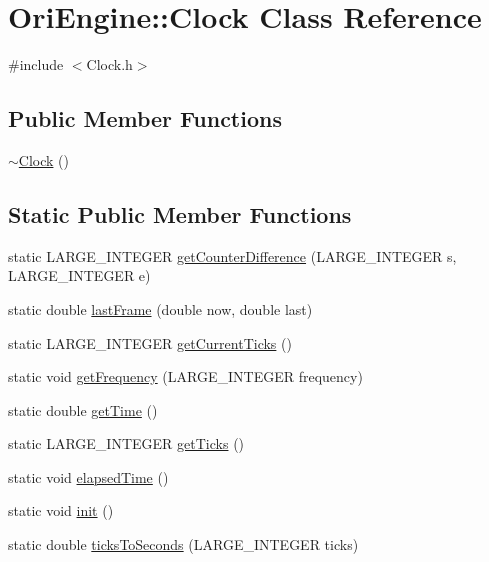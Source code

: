 \hypertarget{class_ori_engine_1_1_clock}{}\section{Ori\+Engine\+:\+:Clock Class Reference}
\label{class_ori_engine_1_1_clock}


{\ttfamily \#include $<$Clock.\+h$>$}

\subsection*{Public Member Functions}
\begin{DoxyCompactItemize}
\item 
\hyperlink{class_ori_engine_1_1_clock_afc976ce68fa85e15cc06f9ed47bddb7c}{$\sim$\+Clock} ()
\end{DoxyCompactItemize}
\subsection*{Static Public Member Functions}
\begin{DoxyCompactItemize}
\item 
static L\+A\+R\+G\+E\+\_\+\+I\+N\+T\+E\+G\+ER \hyperlink{class_ori_engine_1_1_clock_aace1360f2c2588f877a349af1b6e292e}{get\+Counter\+Difference} (L\+A\+R\+G\+E\+\_\+\+I\+N\+T\+E\+G\+ER s, L\+A\+R\+G\+E\+\_\+\+I\+N\+T\+E\+G\+ER e)
\item 
static double \hyperlink{class_ori_engine_1_1_clock_ae7323d08dc94df712cc7ebb8436eba63}{last\+Frame} (double now, double last)
\item 
static L\+A\+R\+G\+E\+\_\+\+I\+N\+T\+E\+G\+ER \hyperlink{class_ori_engine_1_1_clock_aa084e2f95ad8ef19c2b346cd98b76cf1}{get\+Current\+Ticks} ()
\item 
static void \hyperlink{class_ori_engine_1_1_clock_aef03f6bf516fba7b5e79c9dd8b4d1f60}{get\+Frequency} (L\+A\+R\+G\+E\+\_\+\+I\+N\+T\+E\+G\+ER frequency)
\item 
static double \hyperlink{class_ori_engine_1_1_clock_addeddeb3e238c9f9d7c8f9b5e639fe18}{get\+Time} ()
\item 
static L\+A\+R\+G\+E\+\_\+\+I\+N\+T\+E\+G\+ER \hyperlink{class_ori_engine_1_1_clock_a1963f95715596314a277e77401e42e38}{get\+Ticks} ()
\item 
static void \hyperlink{class_ori_engine_1_1_clock_aa89ec268b0bb79f4caa36c4aa50980b8}{elapsed\+Time} ()
\item 
static void \hyperlink{class_ori_engine_1_1_clock_aadaf546dbfb57577d2a9b0e9e4c95123}{init} ()
\item 
static double \hyperlink{class_ori_engine_1_1_clock_af05b430c26528f81d4c0ea530bfc3710}{ticks\+To\+Seconds} (L\+A\+R\+G\+E\+\_\+\+I\+N\+T\+E\+G\+ER ticks)
\end{DoxyCompactItemize}
